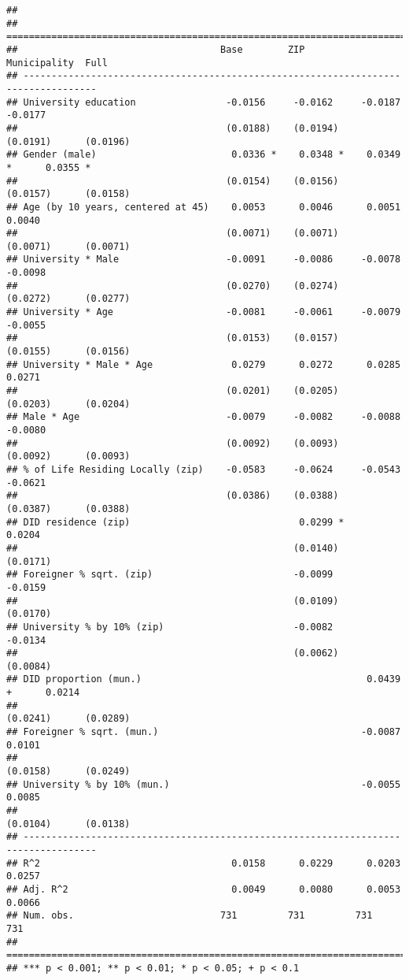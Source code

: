 \documentclass[
]{article}
\begin{document}
\begin{verbatim}
## 
## ===================================================================================
##                                    Base        ZIP         Municipality  Full      
## -----------------------------------------------------------------------------------
## University education                -0.0156     -0.0162     -0.0187       -0.0177  
##                                     (0.0188)    (0.0194)    (0.0191)      (0.0196) 
## Gender (male)                        0.0336 *    0.0348 *    0.0349 *      0.0355 *
##                                     (0.0154)    (0.0156)    (0.0157)      (0.0158) 
## Age (by 10 years, centered at 45)    0.0053      0.0046      0.0051        0.0040  
##                                     (0.0071)    (0.0071)    (0.0071)      (0.0071) 
## University * Male                   -0.0091     -0.0086     -0.0078       -0.0098  
##                                     (0.0270)    (0.0274)    (0.0272)      (0.0277) 
## University * Age                    -0.0081     -0.0061     -0.0079       -0.0055  
##                                     (0.0153)    (0.0157)    (0.0155)      (0.0156) 
## University * Male * Age              0.0279      0.0272      0.0285        0.0271  
##                                     (0.0201)    (0.0205)    (0.0203)      (0.0204) 
## Male * Age                          -0.0079     -0.0082     -0.0088       -0.0080  
##                                     (0.0092)    (0.0093)    (0.0092)      (0.0093) 
## % of Life Residing Locally (zip)    -0.0583     -0.0624     -0.0543       -0.0621  
##                                     (0.0386)    (0.0388)    (0.0387)      (0.0388) 
## DID residence (zip)                              0.0299 *                  0.0204  
##                                                 (0.0140)                  (0.0171) 
## Foreigner % sqrt. (zip)                         -0.0099                   -0.0159  
##                                                 (0.0109)                  (0.0170) 
## University % by 10% (zip)                       -0.0082                   -0.0134  
##                                                 (0.0062)                  (0.0084) 
## DID proportion (mun.)                                        0.0439 +      0.0214  
##                                                             (0.0241)      (0.0289) 
## Foreigner % sqrt. (mun.)                                    -0.0087        0.0101  
##                                                             (0.0158)      (0.0249) 
## University % by 10% (mun.)                                  -0.0055        0.0085  
##                                                             (0.0104)      (0.0138) 
## -----------------------------------------------------------------------------------
## R^2                                  0.0158      0.0229      0.0203        0.0257  
## Adj. R^2                             0.0049      0.0080      0.0053        0.0066  
## Num. obs.                          731         731         731           731       
## ===================================================================================
## *** p < 0.001; ** p < 0.01; * p < 0.05; + p < 0.1
\end{verbatim}
\end{document}
